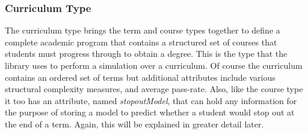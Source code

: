 \documentclass[botnum, fleqn]{unmeethesis}
\begin{document}

        

      \subsubsection{Curriculum Type}
        The curriculum type brings the term and course types together to define a complete academic program that contains a structured set of courses that students must progress through to obtain a degree. This is the type that the library uses to perform a simulation over a curriculum. Of course the curriculum contains an ordered set of terms but additional attributes include various structural complexity measures, and average pass-rate. Also, like the course type it too has an attribute, named \textit{stopoutModel}, that can hold any information for the purpose of storing a model to predict whether a student would stop out at the end of a term. Again, this will be explained in greater detail later.


\end{document}
